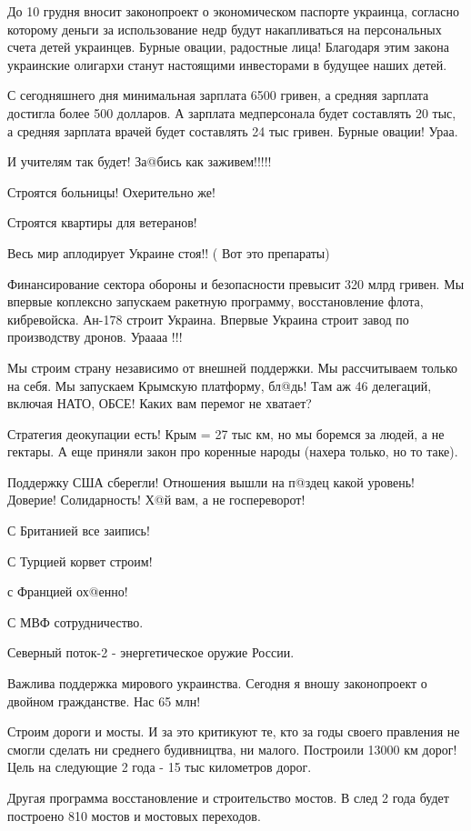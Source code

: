 До 10 грудня вносит законопроект о экономическом паспорте украинца, согласно
которому деньги за использование недр будут накапливаться на персональных счета
детей украинцев. Бурные овации, радостные лица! Благодаря этим закона
украинские олигархи станут настоящими инвесторами в будущее наших детей.

С сегодняшнего дня минимальная зарплата 6500 гривен, а средняя зарплата
достигла более 500 долларов. А зарплата медперсонала будет составлять 20 тыс, а
средняя зарплата врачей будет составлять 24 тыс гривен. Бурные овации! Ураа. 

И учителям так будет! За@бись как заживем!!!!!

Строятся больницы! Охерительно же! 

Строятся квартиры для ветеранов!

Весь мир аплодирует Украине стоя!! ( Вот это препараты)

Финансирование сектора обороны и безопасности превысит 320 млрд гривен. Мы
впервые коплексно запускаем ракетную программу, восстановление флота,
кибревойска. Ан-178 строит Украина. Впервые Украина строит завод по
производству дронов. Ураааа !!!

Мы строим страну независимо от внешней поддержки. Мы рассчитываем только на
себя. Мы запускаем Крымскую платформу, бл@дь! Там аж 46 делегаций, включая
НАТО, ОБСЕ! Каких вам перемог не хватает?

Стратегия деокупации есть! Крым = 27 тыс км, но мы боремся за людей, а не
гектары. А еще приняли закон про коренные народы (нахера только, но то таке). 

Поддержку США сберегли! Отношения вышли на п@здец какой уровень! Доверие!
Солидарность! Х@й вам, а не госпереворот!

С Британией все заипись! 

С Турцией корвет строим! 

с Францией ох@енно! 

С МВФ сотрудничество. 

Северный поток-2 - энергетическое оружие России. 

Важлива поддержка мирового украинства. Сегодня я вношу законопроект о двойном
гражданстве. Нас 65 млн!

Строим дороги и мосты. И за это критикуют те, кто за годы своего правления не
смогли сделать ни среднего будивництва, ни малого. Построили 13000 км дорог!
Цель на следующие 2 года - 15 тыс километров дорог. 

Другая программа восстановление и строительство мостов. В след 2 года будет
построено 810 мостов и мостовых переходов. 

